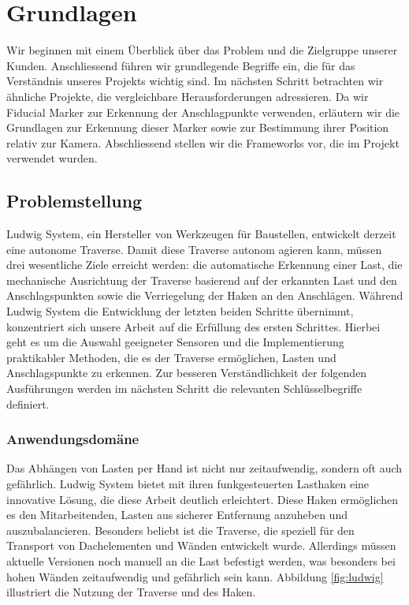 \section{Grundlagen}
Wir beginnen mit einem Überblick über das Problem und die Zielgruppe unserer Kunden.
Anschliessend führen wir grundlegende Begriffe ein, die für das Verständnis unseres Projekts
wichtig sind. Im nächsten Schritt betrachten wir ähnliche Projekte, die vergleichbare Herausforderungen adressieren.
Da wir Fiducial Marker zur Erkennung der Anschlagpunkte verwenden, erläutern wir die Grundlagen zur 
Erkennung dieser Marker sowie zur Bestimmung ihrer Position relativ zur Kamera. Abschliessend stellen wir die
Frameworks vor, die im Projekt verwendet wurden.

\subsection{Problemstellung}
Ludwig System, ein Hersteller von Werkzeugen für Baustellen, entwickelt derzeit eine autonome Traverse. Damit diese 
Traverse autonom agieren kann, müssen drei wesentliche Ziele erreicht werden: die automatische Erkennung einer Last, 
die mechanische Ausrichtung der Traverse basierend auf der erkannten Last und den Anschlagspunkten sowie die Verriegelung 
der Haken an den Anschlägen. Während Ludwig System die Entwicklung der letzten beiden Schritte übernimmt, konzentriert sich
unsere Arbeit auf die Erfüllung des ersten Schrittes. Hierbei geht es um die Auswahl geeigneter Sensoren und die Implementierung
praktikabler Methoden, die es der Traverse ermöglichen, Lasten und Anschlagspunkte zu erkennen. Zur besseren Verständlichkeit der 
folgenden Ausführungen werden im nächsten Schritt die relevanten Schlüsselbegriffe definiert.


\subsubsection{Anwendungsdomäne}
Das Abhängen von Lasten per Hand ist nicht nur zeitaufwendig, sondern oft auch gefährlich. 
Ludwig System bietet mit ihren funkgesteuerten Lasthaken eine innovative Lösung, 
die diese Arbeit deutlich erleichtert. Diese Haken ermöglichen es den Mitarbeitenden, 
Lasten aus sicherer Entfernung anzuheben und auszubalancieren. Besonders beliebt ist 
die Traverse, die speziell für den Transport von Dachelementen und Wänden entwickelt wurde. 
Allerdings müssen aktuelle Versionen noch manuell an die Last befestigt werden, 
was besonders bei hohen Wänden zeitaufwendig und gefährlich sein kann. 
Abbildung \ref{fig:ludwig} illustriert die Nutzung der Traverse und des Haken.

